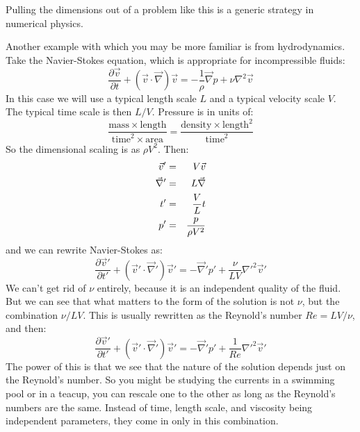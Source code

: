 Pulling the dimensions out of a problem like this is a generic
strategy in numerical physics.

Another example with which you may be more familiar is from
hydrodynamics.  Take the Navier-Stokes equation, which is appropriate
for incompressible fluids:
\begin{equation}
\frac{\partial \vec{v}}{\partial t}
+ \left(\vec{v}\cdot\vec\nabla\right)\vec{v} =
- \frac{1}{\rho} \vec\nabla p + \nu \nabla^2 \vec{v}
\end{equation}
In this case we will use a typical length scale $L$ and a typical
velocity scale $V$. The typical time scale is then $L/V$. Pressure is
in units of:
\begin{equation}
\frac{\mathrm{mass} \times \mathrm{length}}
{\mathrm{time}^2 \times \mathrm{area}} =
\frac{\mathrm{density} \times \mathrm{length}^2}
{\mathrm{time}^2}
\end{equation}
So the dimensional scaling is as $\rho V^2$.
Then:
\begin{eqnarray}
\vec{v}' &=& V \vec{v} \cr
\vec\nabla' &=& L \vec\nabla \cr
t' &=& \frac{V}{L} t \cr
p' &=& \frac{p}{\rho V^2}
\end{eqnarray}
and we can rewrite Navier-Stokes as:
\begin{equation}
\frac{\partial \vec{v}'}{\partial t'}
+ \left(\vec{v}'\cdot\vec\nabla'\right)\vec{v}' =
- \vec\nabla' p' + \frac{\nu}{L V} \nabla'^2 \vec{v}'
\end{equation}
We can't get rid of $\nu$ entirely, because it is an independent
quality of the fluid. But we can see that what matters to the form of
the solution is not $\nu$, but the combination $\nu/LV$. This is
usually rewritten as the Reynold's number $\mathit{Re} = LV / \nu$,
and then:
\begin{equation}
\frac{\partial \vec{v}'}{\partial t'}
+ \left(\vec{v}'\cdot\vec\nabla'\right)\vec{v}' =
- \vec\nabla' p' + \frac{1}{\mathit{Re}} \nabla'^2 \vec{v}'
\end{equation}
The power of this is that we see that the nature of the solution
depends just on the Reynold's number. So you might be studying the
currents in a swimming pool or in a teacup, you can rescale one to the
other as long as the Reynold's numbers are the same. Instead of time,
length scale, and viscosity being independent parameters, they come
in only in this combination.
